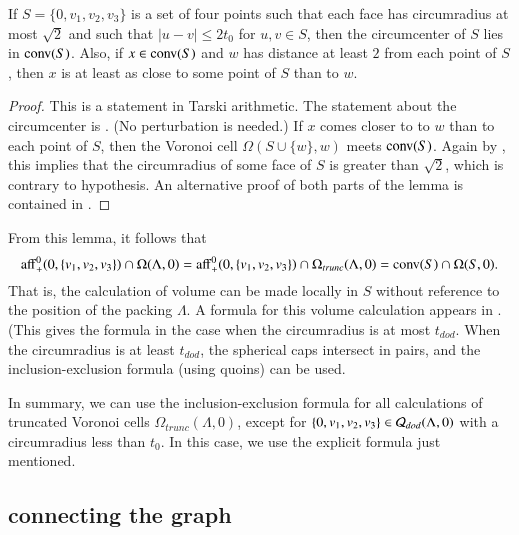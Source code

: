 \begin{lemma}
If $S=\{0,v_1,v_2,v_3\}$ is a set of four points such that each
face has circumradius at most $\sqrt2$ and such that
$|u-v|\le 2t_0$ for $u,v\in S$, then
the circumcenter of $S$ lies in ${\operatorname{conv}}(S)$.  Also, if $x
\in {\operatorname{conv}}(S)$ and $w$ has distance at least $2$ from each
point of $S$, then $x$ is at least as close to some point of $S$ than to
$w$.
\end{lemma}

\begin{proof} This is a statement in Tarski arithmetic.
The statement about the circumcenter is \cite[Lemma~5.18]{DCG}.
(No perturbation is needed.)
If $x$  comes closer to  to $w$  than to each point of $S$, then
the Voronoi cell $\Omega(S\cup\{w\},w)$ meets ${\operatorname{conv}}(S)$.
Again by \cite[Lemma~5.18]{DCG}, this implies that the circumradius
of some face of $S$ is greater than $\sqrt2$, which is contrary
to hypothesis. An alternative proof 
of both parts of the lemma
is contained in \cite[Lemma~3.5,3.6]{arx}.
\end{proof}

From this lemma, it follows that
\begin{equation}\label{eqn:omega-3}
{\operatorname{aff}}^0_+(0,\{v_1,v_2,v_3\}) \cap \Omega(\Lambda,0) = 
{\operatorname{aff}}^0_+(0,\{v_1,v_2,v_3\}) \cap \Omega_{trunc}(\Lambda,0) = 
{\operatorname{conv}}(S)\cap\Omega(S,0).
\end{equation}
That is, the calculation of volume can be made locally in $S$ without
reference to the position of the packing $\Lambda$.
A formula for this volume calculation appears in 
\cite[sec.~8.6.3]{Part1}.  (This gives the formula in the case
when the circumradius is at most $t_{dod}$.  When the circumradius
is at least $t_{dod}$, the spherical caps intersect in pairs,
and the inclusion-exclusion formula (using quoins)
can be used.

In summary, we can use the inclusion-exclusion formula for all
calculations of truncated Voronoi cells $\Omega_{trunc}(\Lambda,0)$,
except for $\{0,v_1,v_2,v_3\}\in {\mathcal Q}_{dod}(\Lambda,0)$ with
a circumradius less than $t_0$.  In this case, we use
the explicit formula just mentioned.

\subsection{connecting the graph}

